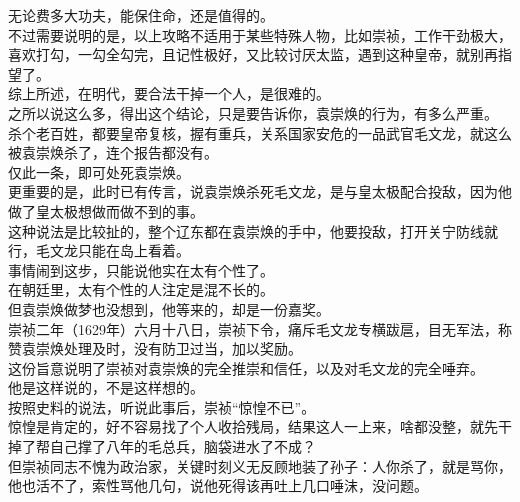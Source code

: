 \begin{multicols}{\theparacolNo}
无论费多大功夫，能保住命，还是值得的。\\

不过需要说明的是，以上攻略不适用于某些特殊人物，比如崇祯，工作干劲极大，喜欢打勾，一勾全勾完，且记性极好，又比较讨厌太监，遇到这种皇帝，就别再指望了。\\

综上所述，在明代，要合法干掉一个人，是很难的。\\

之所以说这么多，得出这个结论，只是要告诉你，袁崇焕的行为，有多么严重。\\

杀个老百姓，都要皇帝复核，握有重兵，关系国家安危的一品武官毛文龙，就这么被袁崇焕杀了，连个报告都没有。\\

仅此一条，即可处死袁崇焕。\\

更重要的是，此时已有传言，说袁崇焕杀死毛文龙，是与皇太极配合投敌，因为他做了皇太极想做而做不到的事。\\

这种说法是比较扯的，整个辽东都在袁崇焕的手中，他要投敌，打开关宁防线就行，毛文龙只能在岛上看着。\\

事情闹到这步，只能说他实在太有个性了。\\

在朝廷里，太有个性的人注定是混不长的。\\

但袁崇焕做梦也没想到，他等来的，却是一份嘉奖。\\

崇祯二年（1629年）六月十八日，崇祯下令，痛斥毛文龙专横跋扈，目无军法，称赞袁崇焕处理及时，没有防卫过当，加以奖励。\\

这份旨意说明了崇祯对袁崇焕的完全推崇和信任，以及对毛文龙的完全唾弃。\\

他是这样说的，不是这样想的。\\

按照史料的说法，听说此事后，崇祯“惊惶不已”。\\

惊惶是肯定的，好不容易找了个人收拾残局，结果这人一上来，啥都没整，就先干掉了帮自己撑了八年的毛总兵，脑袋进水了不成？\\

但崇祯同志不愧为政治家，关键时刻义无反顾地装了孙子：人你杀了，就是骂你，他也活不了，索性骂他几句，说他死得该再吐上几口唾沫，没问题。\\


\end{multicols}
